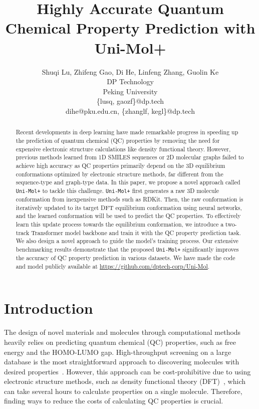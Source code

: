 \documentclass{article}
\title{Highly Accurate Quantum Chemical Property Prediction with Uni-Mol+}
\author{Shuqi Lu, Zhifeng Gao, Di He, Linfeng Zhang, Guolin Ke \\
DP Technology\\
Peking University\\
\{lusq, gaozf\}@dp.tech \\ 
 dihe@pku.edu.cn, \{zhanglf, kegl\}@dp.tech \\
}
\newcommand{\name}{\texttt{Uni-Mol+}\xspace}
\begin{document}
\maketitle


\begin{abstract}
Recent developments in deep learning have made remarkable progress in speeding up the prediction of quantum chemical (QC) properties by removing the need for expensive electronic structure calculations like density functional theory. 
However, previous methods learned from 1D SMILES sequences or 2D molecular graphs failed to achieve high accuracy as QC properties primarily depend on the 3D equilibrium conformations optimized by electronic structure methods, far different from the sequence-type and graph-type data. 
In this paper, we propose a novel approach called \name to tackle this challenge. \name first generates a raw 3D molecule conformation from inexpensive methods such as RDKit. Then, the raw conformation is iteratively updated to its target DFT equilibrium conformation using neural networks, and the learned conformation will be used to predict the QC properties. 
To effectively learn this update process towards the equilibrium conformation, we introduce a two-track Transformer model backbone and train it with the QC property prediction task. We also design a novel approach to guide the model's training process. Our extensive benchmarking results demonstrate that the proposed \name significantly improves the accuracy of QC property prediction in various datasets. 
We have made the code and model publicly available at \url{https://github.com/dptech-corp/Uni-Mol}.
\end{abstract}



\section{Introduction}

The design of novel materials and molecules through computational methods heavily relies on predicting quantum chemical (QC) properties, such as free energy and the HOMO-LUMO gap. High-throughput screening on a large database is the most straightforward approach to discovering molecules with desired properties~\cite{jain2013commentary}. However, this approach can be cost-prohibitive due to using electronic structure methods, such as density functional theory (DFT)~\cite{jones2015density}, which can take several hours to calculate properties on a single molecule. Therefore, finding ways to reduce the costs of calculating QC properties is crucial. 
\end{document}

